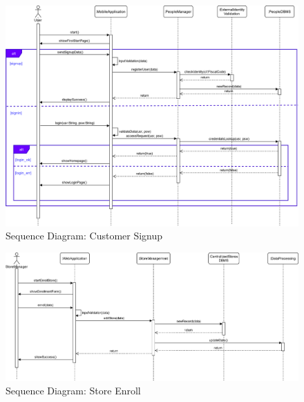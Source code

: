 \begin{figure}[H]
	\includegraphics[width=\linewidth]{../Diagrams/Sequence/sequence_customer_signup.png}
	\caption{Sequence Diagram: Customer Signup}
	\label{fig:sCusSign}
\end{figure}

\begin{figure}[H]
	\includegraphics[width=\linewidth]{../Diagrams/Sequence/sequence_store_enroll.png}
	\caption{Sequence Diagram: Store Enroll}
	\label{fig:sStoreEn}
\end{figure}


